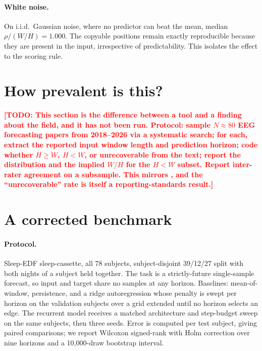 \documentclass{article}
\newcommand{\TODO}[1]{\textcolor{red}{\textbf{[TODO: #1]}}}
\begin{document}
\paragraph{White noise.} On i.i.d.\ Gaussian noise, where no predictor can beat the
mean, median $\rho/(W/H)=1.000$. The copyable positions remain exactly
reproducible because they are present in the input, irrespective of predictability.
This isolates the effect to the scoring rule.

\section{How prevalent is this?}

\TODO{This section is the difference between a tool and a finding about the field,
and it has not been run. Protocol: sample $N\!\approx\!80$ EEG forecasting papers
from 2018--2026 via a systematic search; for each, extract the reported input
window length and prediction horizon; code whether $H\ge W$, $H<W$, or
unrecoverable from the text; report the distribution and the implied $W/H$ for the
$H<W$ subset. Report inter-rater agreement on a subsample. This mirrors
\citet{mcgreivy2024}, and the ``unrecoverable'' rate is itself a reporting-standards
result.}

\section{A corrected benchmark}

\paragraph{Protocol.} Sleep-EDF sleep-cassette, all 78 subjects, subject-disjoint
39/12/27 split with both nights of a subject held together. The task is a
strictly-future single-sample forecast, so input and target share no samples at any
horizon. Baselines: mean-of-window, persistence, and a ridge autoregression whose
penalty is swept per horizon on the validation subjects over a grid extended until
no horizon selects an edge. The recurrent model receives a matched architecture and
step-budget sweep on the same subjects, then three seeds. Error is computed per
test subject, giving paired comparisons; we report Wilcoxon signed-rank with
Holm correction over nine horizons and a 10{,}000-draw bootstrap interval.
\end{document}
